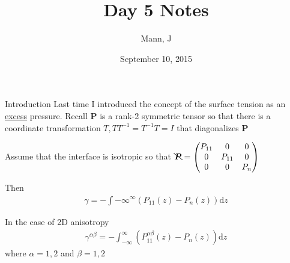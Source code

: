 \documentclass{article}
\author{Mann, J}
\title{Day 5 Notes}
\date{September 10, 2015}
\renewcommand{\d}[0]{\mathrm{d}}
\newcommand{\matr}[1]{\bm{#1}}
\newcommand{\diag}[1]{\bcancel{#1}}
\begin{document}
\maketitle{}
\begin{section}{Introduction}
  Last time I introduced the concept of the surface tension as an \underline{excess} pressure. 
  Recall $\matr{P}$ is a rank-2 symmetric tensor so that there is a coordinate transformation $T, TT^{-1} = T^{-1}T = I$ that diagonalizes $\matr{P}$

Assume that the interface is isotropic so that $\diag{\matr{P}} = \begin{pmatrix}
    P_{11} & 0 & 0\\
    0 & P_{11} & 0\\
    0 & 0 & P_{n}
  \end{pmatrix}$

Then \begin{align*}
\gamma = - \int{-\infty}^{\infty} \left(P_{11}(z) - P_n(z)\right) \d z
\end{align*}

In the case of 2D anisotropy
\begin{align*}
  \gamma^{\alpha\beta} = -\int_{-\infty}^{\infty}\left(P_{11}^{\alpha\beta}(z) - P_n(z)\right)\d z
\end{align*}
where $\alpha=1,2$ and $\beta=1,2$
\end{section}
\end{document}

